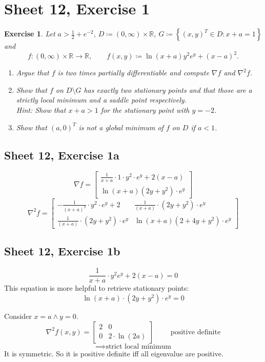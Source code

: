 \documentclass{article}
\newtheorem{ex}{Exercise} %
\newcommand{\set}[1]{\left\{#1\right\}}
\begin{document}
\section{Sheet 12, Exercise 1}
\begin{ex}
  Let $a > \frac12 + e^{-2}$, $D \coloneqq (0, \infty) \times \mathbb R$, $G \coloneqq \set{(x, y)^T \in D: x + a = 1}$ and
  \[ f: (0, \infty) \times \mathbb R \to \mathbb R, \qquad f(x,y) \coloneqq \ln(x + a) y^2 e^y + (x - a)^2. \]
  \begin{enumerate}
    \item Argue that $f$ is two times partially differentiable and compute $\nabla f$ and $\nabla^2 f$.
    \item Show that $f$ on $D \setminus G$ has exactly two stationary points and that those are a strictly local minimum and a saddle point respectively. \\
      \emph{Hint:} Show that $x + a > 1$ for the stationary point with $y = -2$.
    \item Show that $(a, 0)^T$ is not a global minimum of $f$ on $D$ if $a < 1$.
  \end{enumerate}
\end{ex}

\subsection{Sheet 12, Exercise 1a}
\[
  \nabla f = \begin{bmatrix}
    \frac{1}{x + a} \cdot 1 \cdot y^2 \cdot e^y + 2 (x - a) \\
    \ln(x + a) (2y + y^2) \cdot e^y
  \end{bmatrix}
\] \[
  \nabla^2 f = \begin{bmatrix}
    -\frac{1}{(x + a)^2} \cdot y^2 \cdot e^y + 2  & \frac{1}{(x + a)} \cdot (2y + y^2) \cdot e^y \\
    \frac{1}{(x + a)} \cdot (2y + y^2) \cdot e^y  & \ln(x + a) (2 + 4y + y^2) \cdot e^y
  \end{bmatrix}
\]

\subsection{Sheet 12, Exercise 1b}
\[ \frac{1}{x + a} \cdot y^2 e^y + 2 (x - a) = 0 \]
This equation is more helpful to retrieve stationary points:
\[ \ln(x + a) \cdot (2y + y^2) \cdot e^y = 0 \]

Consider $x = a \land y = 0$.
\[
  \nabla^2 f(x, y) =
  \begin{bmatrix}
    2 & 0 \\
    0 & 2 \cdot \ln(2a)
  \end{bmatrix} \qquad \text{ positive definite}
\] \[
  \implies \text{strict local minimum}
\]
It is symmetric. So it is positive definite iff all eigenvalue are positive.
\end{document}
